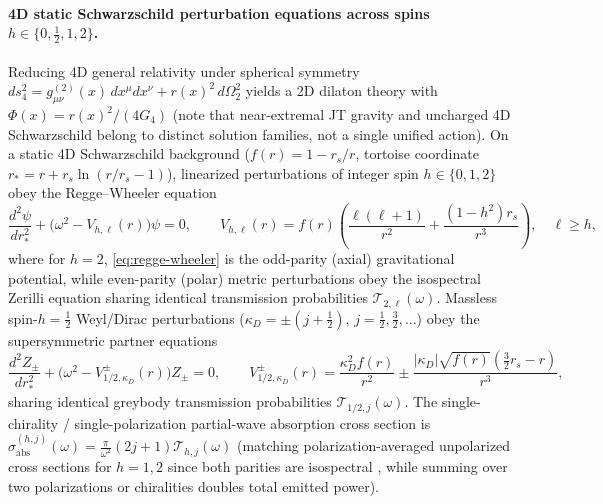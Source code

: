 \documentclass[11pt,a4paper]{article}
\theoremstyle{definition}
\theoremstyle{remark}
\newcommand{\cT}{\mathcal{T}}
\newcommand{\1}{\mathbf{1}}
\begin{document}
\paragraph{4D static Schwarzschild perturbation equations across spins $h\in\{0,\frac{1}{2},1,2\}$.}
Reducing 4D general relativity under spherical symmetry $ds_4^2 = g_{\mu\nu}^{(2)}(x)\,dx^\mu dx^\nu + r(x)^2\,d\Omega_2^2$ yields a 2D dilaton theory with $\Phi(x)=r(x)^2/(4G_4)$ (note that near-extremal JT gravity and uncharged 4D Schwarzschild belong to distinct solution families, not a single unified action). On a static 4D Schwarzschild background ($f(r)=1-r_s/r$, tortoise coordinate $r_*=r+r_s\ln(r/r_s-1)$), linearized perturbations of integer spin $h\in\{0,1,2\}$ obey the Regge--Wheeler equation \cite{ReggeWheeler1957,Teukolsky1973}
\begin{equation}\label{eq:regge-wheeler}
  \frac{d^2\psi}{dr_*^2} + \bigl(\omega^2 - V_{h,\ell}(r)\bigr)\psi = 0, \qquad
  V_{h,\ell}(r) = f(r)\!\left(\frac{\ell(\ell+1)}{r^2} + \frac{(1-h^2)r_s}{r^3}\right), \quad \ell \ge h,
\end{equation}
where for $h=2$, \eqref{eq:regge-wheeler} is the odd-parity (axial) gravitational potential, while even-parity (polar) metric perturbations obey the isospectral Zerilli equation \cite{Zerilli1970} sharing identical transmission probabilities $\cT_{2,\ell}(\omega)$. Massless spin-$h=\frac{1}{2}$ Weyl/Dirac perturbations ($\kappa_D=\pm(j+\frac{1}{2})$, $j=\frac{1}{2},\frac{3}{2},\dots$) obey the supersymmetric partner equations
\begin{equation}\label{eq:dirac-4d}
  \frac{d^2 Z_\pm}{dr_*^2} + \bigl(\omega^2 - V_{1/2,\kappa_D}^\pm(r)\bigr) Z_\pm = 0, \qquad
  V_{1/2,\kappa_D}^\pm(r) = \frac{\kappa_D^2 f(r)}{r^2} \pm \frac{|\kappa_D|\sqrt{f(r)}(\frac{3}{2}r_s - r)}{r^3},
\end{equation}
sharing identical greybody transmission probabilities $\cT_{1/2,j}(\omega)$. The single-chirality / single-polarization partial-wave absorption cross section is $\sigma_{\mathrm{abs}}^{(h,j)}(\omega) = \frac{\pi}{\omega^2}(2j+1)\cT_{h,j}(\omega)$ (matching polarization-averaged unpolarized cross sections for $h=1,2$ since both parities are isospectral \cite{Unruh1976Abs,Page1976,Crispino2007}, while summing over two polarizations or chiralities doubles total emitted power).
\end{document}

